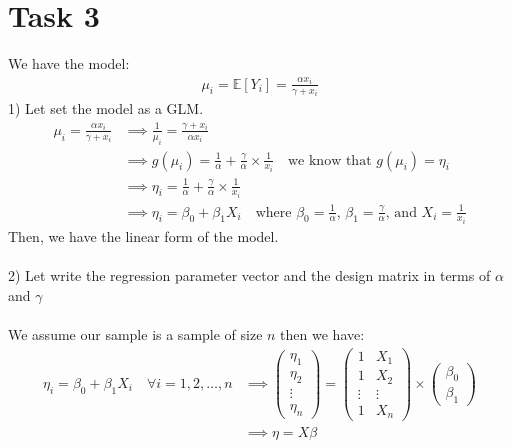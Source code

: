 \documentclass[11pt,a4paper]{article}
\begin{document}
\section*{Task 3}
We have the model:
\begin{align*}
	\mu_{i}=\mathbb{E}[Y_{i}]=\frac{\alpha x_{i}}{\gamma+x_{i}}
\end{align*}
1) Let set the model as a GLM.
\begin{align*}
\mu_{i}=\frac{\alpha x_{i}}{\gamma+x_{i}}&\implies \frac{1}{\mu_{i}}=\frac{\gamma+x_{i}}{\alpha x_{i}}\\
&\implies g(\mu_{i})=\frac{1}{\alpha}+\frac{\gamma}{\alpha}\times \frac{1}{x_{i}}\quad \text{we know that $g(\mu_{i})=\eta_{i}$}\\
&\implies \eta_{i}=\frac{1}{\alpha}+\frac{\gamma}{\alpha}\times \frac{1}{x_{i}}\\
&\implies \eta_{i}=\beta_{0}+\beta_{1}X_{i}\quad\text{where $\beta_{0}=\frac{1}{\alpha}$, $\beta_{1}=\frac{\gamma}{\alpha}$, and $X_{i}=\frac{1}{x_{i}}$}
\end{align*}
Then, we have the linear form of the model.\\
\\2) Let write the regression parameter vector and the design matrix in terms of $\alpha$ and $\gamma$\\
\\We assume our sample is a sample of size $n$ then we have:
\begin{align*}
	\eta_{i}=\beta_{0}+\beta_{1}X_{i}\quad\forall i=1,2,\dots,n&\implies \begin{pmatrix}
	\eta_{1}	\\
	\eta_{2}	\\
	\vdots\\
	\eta_{n}	
	\end{pmatrix}=\begin{pmatrix}{}
1	& X_{1} \\
1	& X_{2} \\
\vdots	&\vdots  \\
1	& X_{n}
\end{pmatrix}\times\begin{pmatrix}
\beta_{0}\\
\beta_{1} 
\end{pmatrix}\\
&\implies \eta=X\beta
\end{align*}
\end{document}
